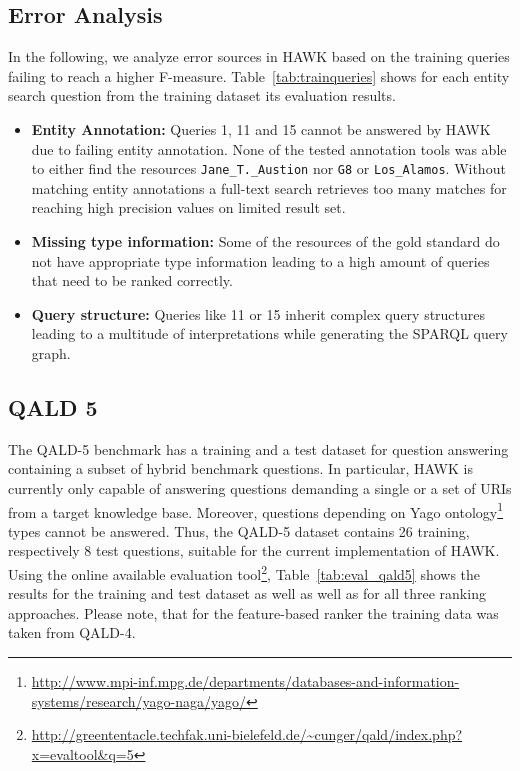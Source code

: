 \subsection{Error Analysis}

In the following, we analyze error sources in HAWK based on the training queries failing to reach a higher F-measure.
Table~\ref{tab:trainqueries} shows for each entity search question from the training dataset its evaluation results.
\begin{itemize}
\item \textbf{Entity Annotation: } Queries 1, 11 and 15 cannot be answered by HAWK due to failing entity annotation. None of the tested annotation tools was able to either find the resources  \texttt{Jane\_T.\_Austion} nor \texttt{G8} or \texttt{Los\_Alamos}. 
Without matching entity annotations a full-text search retrieves too many matches for reaching high precision values on limited result set.
\item \textbf{Missing type information:} Some of the resources of the gold standard do not have appropriate type information leading to a high amount of queries that need to be ranked correctly.
\item \textbf{Query structure: } Queries like 11 or 15 inherit complex query structures leading to a multitude of interpretations while generating the SPARQL query graph.
\end{itemize}


%

\subsection{QALD 5}
The QALD-5 benchmark has a training and a test dataset for question answering containing a subset of hybrid benchmark questions.
In particular, HAWK is currently only capable of answering questions demanding a single or a set of URIs from a target knowledge base. 
Moreover, questions depending on Yago ontology\footnote{\url{http://www.mpi-inf.mpg.de/departments/databases-and-information-systems/research/yago-naga/yago/}} types cannot be answered.
Thus, the QALD-5 dataset contains 26 training, respectively 8 test questions, suitable for the current implementation of HAWK.
Using the online available evaluation tool\footnote{\url{http://greententacle.techfak.uni-bielefeld.de/~cunger/qald/index.php?x=evaltool&q=5}}, Table~\ref{tab:eval_qald5} shows the results for the training and test dataset as well as well as for all three ranking approaches.
Please note, that for the feature-based ranker the training data was taken from QALD-4.

